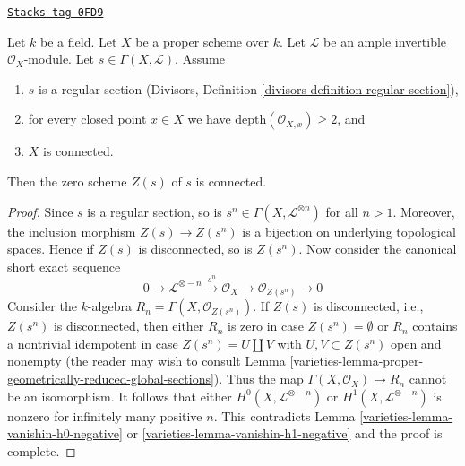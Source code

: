 \begin{lemma}
\label{varieties-lemma-connectedness-ample-divisor}
\href{https://stacks.math.columbia.edu/tag/0FD9}{\texttt{Stacks tag 0FD9}}

Let $k$ be a field. Let $X$ be a proper scheme over $k$. Let $\mathcal{L}$
be an ample invertible $\mathcal{O}_X$-module. Let
$s \in \Gamma(X, \mathcal{L})$. Assume
\begin{enumerate}
\item $s$ is a regular section
(Divisors, Definition \ref{divisors-definition-regular-section}),
\item for every closed point $x \in X$ we have
$\text{depth}(\mathcal{O}_{X, x}) \geq 2$, and
\item $X$ is connected.
\end{enumerate}
Then the zero scheme $Z(s)$ of $s$ is connected.
\end{lemma}

\begin{proof}

Since $s$ is a regular section, so is
$s^n \in \Gamma(X, \mathcal{L}^{\otimes n})$ for all $n > 1$.
Moreover, the inclusion morphism $Z(s) \to Z(s^n)$ is a bijection
on underlying topological spaces. Hence if $Z(s)$ is disconnected,
so is $Z(s^n)$. Now consider the canonical short exact sequence
$$
0 \to \mathcal{L}^{\otimes -n} \xrightarrow{s^n}
\mathcal{O}_X \to \mathcal{O}_{Z(s^n)} \to 0
$$
Consider the $k$-algebra $R_n = \Gamma(X, \mathcal{O}_{Z(s^n)})$.
If $Z(s)$ is disconnected, i.e., $Z(s^n)$ is disconnected,
then either $R_n$ is zero in case $Z(s^n) = \emptyset$ or
$R_n$ contains a nontrivial idempotent in case $Z(s^n) = U \amalg V$ with
$U, V \subset Z(s^n)$ open and nonempty (the reader may wish to consult
Lemma \ref{varieties-lemma-proper-geometrically-reduced-global-sections}).
Thus the map $\Gamma(X, \mathcal{O}_X) \to R_n$ cannot be an isomorphism.
It follows that either $H^0(X, \mathcal{L}^{\otimes -n})$ or
$H^1(X, \mathcal{L}^{\otimes -n})$ is nonzero for infinitely
many positive $n$. This contradicts Lemma \ref{varieties-lemma-vanishin-h0-negative} or
\ref{varieties-lemma-vanishin-h1-negative}
and the proof is complete.
\end{proof}



